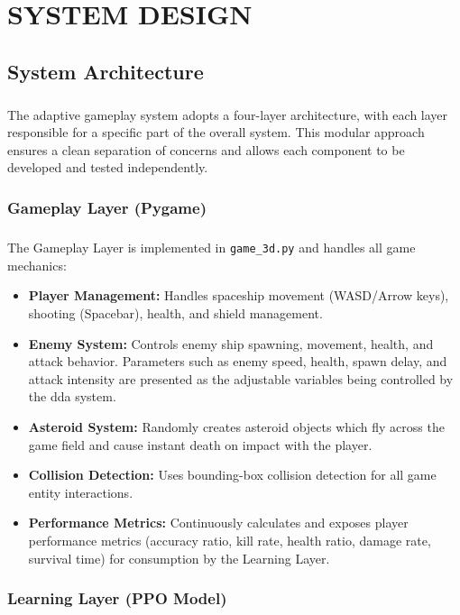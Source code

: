 \chapter{\MakeUppercase{System Design}}
\justifying
\section{System Architecture}
\paragraph{} The adaptive gameplay system adopts a four-layer architecture, with each layer responsible for a specific part of the overall system. This modular approach ensures a clean separation of concerns and allows each component to be developed and tested independently.

\subsection{Gameplay Layer (Pygame)}
\paragraph{} The Gameplay Layer is implemented in \texttt{game\_3d.py} and handles all game mechanics:
\begin{itemize}
	\item \textbf{Player Management:} Handles spaceship movement (WASD/Arrow keys), shooting (Spacebar), health, and shield management.
	\item \textbf{Enemy System:} Controls enemy ship spawning, movement, health, and attack behavior. Parameters such as enemy speed, health, spawn delay, and attack intensity are presented as the adjustable variables being controlled by the \ac{dda} system.
	\item \textbf{Asteroid System:} Randomly creates asteroid objects which fly across the game field and cause instant death on impact with the player.
	\item \textbf{Collision Detection:} Uses bounding-box collision detection for all game entity interactions.
	\item \textbf{Performance Metrics:} Continuously calculates and exposes player performance metrics (accuracy ratio, kill rate, health ratio, damage rate, survival time) for consumption by the Learning Layer.
\end{itemize}

\subsection{Learning Layer (PPO Model)}
